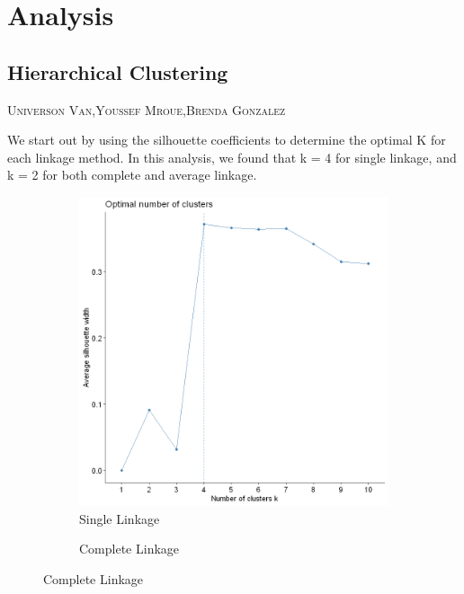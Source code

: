 \documentclass[12pt]{article}
\makeatletter
\newcommand{\chapterauthor}[1]{%
	{\parindent0pt\vspace*{-10pt}%
		\linespread{1.1}\large\scshape#1%
		\par\nobreak\vspace*{10pt}}
	\@afterheading%
}
\makeatother
\begin{document}
\section{Analysis}
\subsection{Hierarchical Clustering}
\chapterauthor{Universon Van,Youssef Mroue,Brenda Gonzalez}
We start out by using the silhouette coefficients to determine the optimal K for each linkage method. In this analysis, we found that k = 4 for single linkage, and k = 2 for both complete and average linkage. 
\begin{figure}[h]
	\caption{Optimal K by linkage method}
	\begin{subfigure}{0.45\textwidth}
		\caption{Single Linkage}		
		\includegraphics[width=\textwidth]{Images/Hierarchial_silhouette_single}
	\end{subfigure}
	\centering
	\begin{subfigure}{0.45\textwidth}
		\caption{Complete Linkage}

\end{subfigure}
\end{figure}
\end{document}
